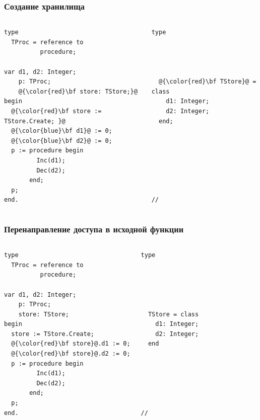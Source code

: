 \documentclass[roman,12pt]{beamer}
\begin{document}
\begin{frame}[fragile]
  \frametitle{Создание хранилища}
  \begin{columns}[c]
    \column{2.2in}
     \begin{lstlisting}[escapechar=@,basicstyle=\scriptsize]
type
  TProc = reference to
          procedure;

var d1, d2: Integer;
    p: TProc;
    @{\color{red}\bf store: TStore;}@
begin
  @{\color{red}\bf store := TStore.Create; }@
  @{\color{blue}\bf d1}@ := 0;
  @{\color{blue}\bf d2}@ := 0;
  p := procedure begin
         Inc(d1);
         Dec(d2);
       end;
  p;
end.
     \end{lstlisting}
   \column{2.2in}
     \begin{lstlisting}[escapechar=@,basicstyle=\scriptsize]  
type




  @{\color{red}\bf TStore}@ = class
    d1: Integer;
    d2: Integer;
  end;







//

     \end{lstlisting}

  \end{columns}
\end{frame}

\begin{frame}[fragile]
  \frametitle{Перенаправление доступа в исходной функции}
  \begin{columns}[c]
    \column{2.2in}
     \begin{lstlisting}[escapechar=@,basicstyle=\scriptsize]
type
  TProc = reference to
          procedure;

var d1, d2: Integer;
    p: TProc;
    store: TStore;
begin
  store := TStore.Create;
  @{\color{red}\bf store}@.d1 := 0;
  @{\color{red}\bf store}@.d2 := 0;
  p := procedure begin
         Inc(d1);
         Dec(d2);
       end;
  p;
end.
     \end{lstlisting}
   \column{2.2in}
     \begin{lstlisting}[escapechar=@,basicstyle=\scriptsize]  
type





  TStore = class
    d1: Integer;
    d2: Integer;
  end






//
     \end{lstlisting}

  \end{columns}
\end{frame}
\end{document}
